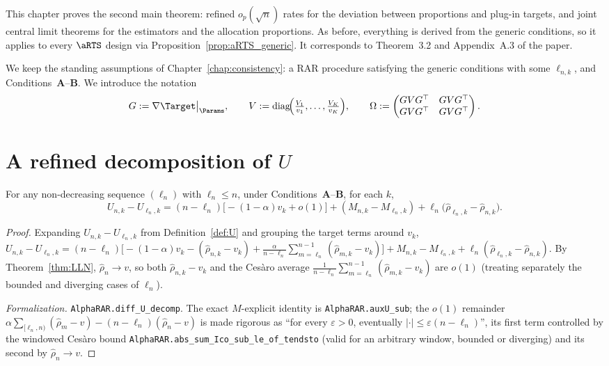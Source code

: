 This chapter proves the second main theorem: refined $o_p(\sqrt n)$ rates for the
deviation between proportions and plug-in targets, and joint central limit
theorems for the estimators and the allocation proportions. As before, everything
is derived from the generic conditions, so it applies to every $\aRTS$ design via
Proposition~\ref{prop:aRTS_generic}. It corresponds to Theorem~3.2 and
Appendix~A.3 of the paper.

We keep the standing assumptions of Chapter~\ref{chap:consistency}: a RAR
procedure satisfying the generic conditions with some $\ell_{n,k}$, and
Conditions~\textbf{A}--\textbf{B}. We introduce the notation
\[
  G := \nabla\Target\big|_\Params, \qquad
  V := \mathrm{diag}\!\Big(\tfrac{V_1}{v_1}, \dots, \tfrac{V_K}{v_K}\Big), \qquad
  \Omega := \begin{pmatrix} GVG^\top & GVG^\top\\ GVG^\top & GVG^\top\end{pmatrix}.
\]

\section{A refined decomposition of \texorpdfstring{$U$}{U}}
\label{sec:norm_U}

\begin{lemma}\label{lem:diff_U_decomp}
\leanok
{}
For any non-decreasing sequence $(\ell_n)$ with $\ell_n\le n$, under
Conditions~\textbf{A}--\textbf{B}, for each $k$,
\[
  U_{n,k} - U_{\ell_n,k}
  = (n-\ell_n)\big[-(1-\alpha)v_k + o(1)\big]
    + (M_{n,k} - M_{\ell_n,k})
    + \ell_n\big(\hat{\rho}_{\ell_n,k} - \hat{\rho}_{n,k}\big).
\]
\end{lemma}

\begin{proof}\leanok
{}
Expanding $U_{n,k}-U_{\ell_n,k}$ from Definition~\ref{def:U} and grouping the
target terms around $v_k$,
$U_{n,k}-U_{\ell_n,k}
 = (n-\ell_n)\big[-(1-\alpha)v_k - (\hat{\rho}_{n,k}-v_k)
   + \frac{\alpha}{n-\ell_n}\sum_{m=\ell_n}^{n-1}(\hat{\rho}_{m,k}-v_k)\big]
   + M_{n,k}-M_{\ell_n,k} + \ell_n(\hat{\rho}_{\ell_n,k}-\hat{\rho}_{n,k})$.
By Theorem~\ref{thm:LLN}, $\hat{\rho}_n\to v$, so both $\hat{\rho}_{n,k}-v_k$ and
the Cesàro average $\frac1{n-\ell_n}\sum_{m=\ell_n}^{n-1}(\hat{\rho}_{m,k}-v_k)$
are $o(1)$ (treating separately the bounded and diverging cases of $\ell_n$).

\emph{Formalization.} \texttt{AlphaRAR.diff\_U\_decomp}. The exact $M$-explicit identity is
\texttt{AlphaRAR.auxU\_sub}; the $o(1)$ remainder $\alpha\sum_{[\ell_n,n)}(\hat\rho_m-v)
-(n-\ell_n)(\hat\rho_n-v)$ is made rigorous as ``for every $\varepsilon>0$, eventually
$|\cdot|\le\varepsilon(n-\ell_n)$'', its first term controlled by the windowed Cesàro bound
\texttt{AlphaRAR.abs\_sum\_Ico\_sub\_le\_of\_tendsto} (valid for an arbitrary window, bounded or
diverging) and its second by $\hat\rho_n\to v$.
\end{proof}

